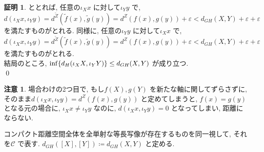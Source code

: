 \documentclass[10pt, fleqn, label-section=none]{bxjsarticle}
\theoremstyle{definition}
\newtheorem*{pf*}{証明}
\newtheorem{remark}[dfn]{注意}
\newcommand{\veps}{\varepsilon}
\newcommand{\cbra}[1]{\mleft\{#1\mright\}}
\begin{document}
\begin{pf*}
ととれば, 任意の$\iota_X x$ に対して$\iota_Y y$ で, $d(\iota_X x , \iota_Y y) = d^{\tilde Z} (\tilde f (x), \tilde g (y) ) = d^Z (f(x), g(y) ) + \veps  < d_{GH}(X,Y) + \veps + \veps $ を満たすものがとれる.  同様に, 任意の$\iota_Y y$ に対して$\iota_X x$ で, $d(\iota_X x , \iota_Y y) = d^{\tilde Z} (\tilde f (x), \tilde g (y) ) = d^Z (f(x), g(y) ) + \veps  < d_{GH}(X,Y) + \veps + \veps $ を満たすものがとれる. \\
結局のところ, $\inf \cbra{d_H (\iota_X X, \iota_Y Y)} \leq d_{GH} (X,Y)$ が成り立つ. \\
\qed
\end{pf*}

\begin{remark}
場合わけの2つ目で, もし$f(X), g(Y)$ を新たな軸に関してずらさずに, そのまま$d(\iota_X x , \iota_Y y) = d^Z (f(x), g(y))$ と定めてしまうと, $f(x) = g(y)$ となる元の場合に, $\iota_X x \neq \iota_Y y$ なのに, $d(\iota_X x , \iota_Y y) = 0$ となってしまい, 距離にならない.
\end{remark}



コンパクト距離空間全体を全単射な等長写像が存在するものを同一視して, それを$\mathcal{C}$ で表す.
$d_{GH}([X],[Y]) \coloneqq d_{GH}(X,Y)$ と定める.
\end{document}

